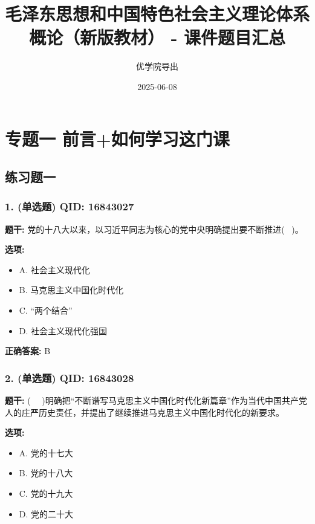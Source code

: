 \documentclass[12pt,UTF8]{ctexart}
\title{毛泽东思想和中国特色社会主义理论体系概论（新版教材） - 课件题目汇总}
\author{优学院导出}
\date{2025-06-08}
\begin{document}
\maketitle


\section*{专题一 前言+如何学习这门课}
\hrulefill

\subsection*{练习题一}

\subsubsection*{1. (单选题) \small QID: 16843027}

\textbf{题干:}
党的十八大以来，以习近平同志为核心的党中央明确提出要不断推进(  )。

\textbf{选项:}
\begin{itemize}[leftmargin=*]

  \item A. 社会主义现代化

  \item B. 马克思主义中国化时代化

  \item C. “两个结合”

  \item D. 社会主义现代化强国

\end{itemize}

\textbf{正确答案:}
B

\vspace{0.3em}\hrulefill\vspace{0.7em}

\subsubsection*{2. (单选题) \small QID: 16843028}

\textbf{题干:}
(   )明确把“不断谱写马克思主义中国化时代化新篇章”作为当代中国共产党人的庄严历史责任，并提出了继续推进马克思主义中国化时代化的新要求。

\textbf{选项:}
\begin{itemize}[leftmargin=*]

  \item A. 党的十七大

  \item B. 党的十八大

  \item C. 党的十九大

  \item D. 党的二十大

\end{itemize}
\end{document}
